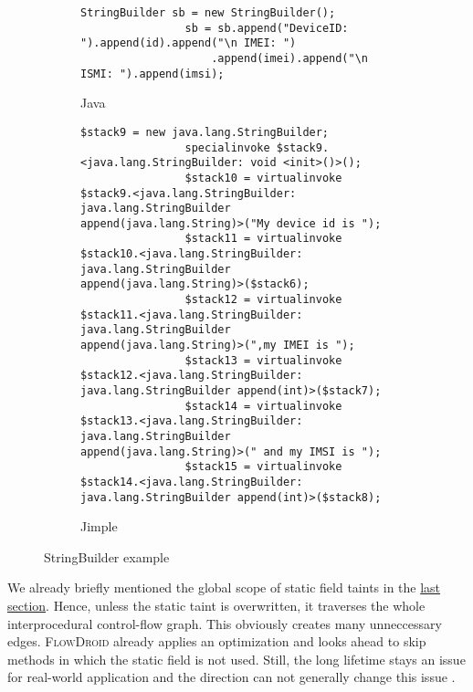 \documentclass[../draft.tex]{subfiles}
\begin{document}
    \begin{figure}[tbp]
        \centering
        \begin{subfigure}[b]{\textwidth}
            \begin{lstlisting}[gobble=16]
                StringBuilder sb = new StringBuilder();
                sb = sb.append("DeviceID: ").append(id).append("\n IMEI: ")
                    .append(imei).append("\n ISMI: ").append(imsi);
            \end{lstlisting}
            \caption{Java}
        \end{subfigure}
        \qquad
        \begin{subfigure}[b]{\textwidth}
            \begin{lstlisting}[language=Jimple, gobble=16]
                $stack9 = new java.lang.StringBuilder;
                specialinvoke $stack9.<java.lang.StringBuilder: void <init>()>();
                $stack10 = virtualinvoke $stack9.<java.lang.StringBuilder: java.lang.StringBuilder append(java.lang.String)>("My device id is ");
                $stack11 = virtualinvoke $stack10.<java.lang.StringBuilder: java.lang.StringBuilder append(java.lang.String)>($stack6);
                $stack12 = virtualinvoke $stack11.<java.lang.StringBuilder: java.lang.StringBuilder append(java.lang.String)>(",my IMEI is ");
                $stack13 = virtualinvoke $stack12.<java.lang.StringBuilder: java.lang.StringBuilder append(int)>($stack7);
                $stack14 = virtualinvoke $stack13.<java.lang.StringBuilder: java.lang.StringBuilder append(java.lang.String)>(" and my IMSI is ");
                $stack15 = virtualinvoke $stack14.<java.lang.StringBuilder: java.lang.StringBuilder append(int)>($stack8);
            \end{lstlisting}
            \caption{Jimple}
        \end{subfigure}
        \caption{StringBuilder example}
        \label{lst:stringbuilder}
    \end{figure}

    We already briefly mentioned the global scope of static field taints in the \hyperref[s:rules]{last section}.
    Hence, unless the static taint is overwritten, it traverses the whole interprocedural control-flow graph.
    This obviously creates many unneccessary edges. \textsc{FlowDroid} already applies an optimization and looks ahead to skip methods in which the static field is not used.
    Still, the long lifetime stays an issue for real-world application and the direction can not generally change this issue \cite{Arzt2017PhD}.
\end{document}
